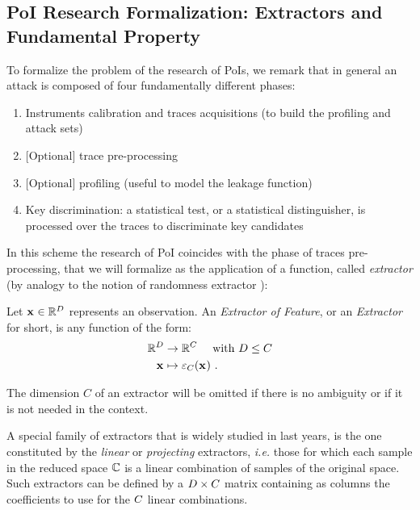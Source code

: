 \subsection{PoI Research Formalization: Extractors and Fundamental Property}


To formalize the problem of the research of PoIs, we remark that in general an attack is composed of four fundamentally different phases:

\begin{enumerate}
\item Instruments calibration and traces acquisitions (to build the profiling and attack sets)
\item $\mbox{[Optional]}$ trace pre-processing
\item $\mbox{[Optional]}$  profiling (useful to model the leakage function)
\item Key discrimination: a  statistical test, or a statistical distinguisher, is processed over the  traces to discriminate key candidates
\end{enumerate}
In this scheme the research of PoI coincides with the phase of traces pre-processing, that we will formalize as the application of a function, called {\em extractor} (by analogy to the notion of randomness extractor \cite{DBLP:journals/jcss/NisanZ96}):

\begin{definition}
Let $\sss[]{}\in \mathbb{R}^\traceLength$ represents an observation. An {\em Extractor of Feature}, or an {\em Extractor} for short, is any function of the form:
\begin{align*}
\mathbb{R}^\traceLength & \rightarrow \mathbb{R}^\newTraceLength \quad \mbox{ with } \traceLength \leq \newTraceLength \\
\sss[]{} & \mapsto \extractor[\newTraceLength]{\sss[]{}} \mbox{ .}
\end{align*}
\end{definition}
\begin{notation}
The dimension $C$ of an extractor will be omitted if there is no ambiguity or if it is not needed in the context.
\end{notation}

\begin{example}
A special family of extractors that is widely studied in last years, is the one constituted by the {\em linear} or {\em projecting} extractors, \textit{i.e.} those for which each sample in the reduced space $\mathbb{\newTraceLength}$ is a linear combination of samples of the original space. Such extractors can be defined by a $\traceLength \times \newTraceLength$ matrix containing as columns the coefficients to use for the $\newTraceLength$ linear combinations. 
\end{example}

